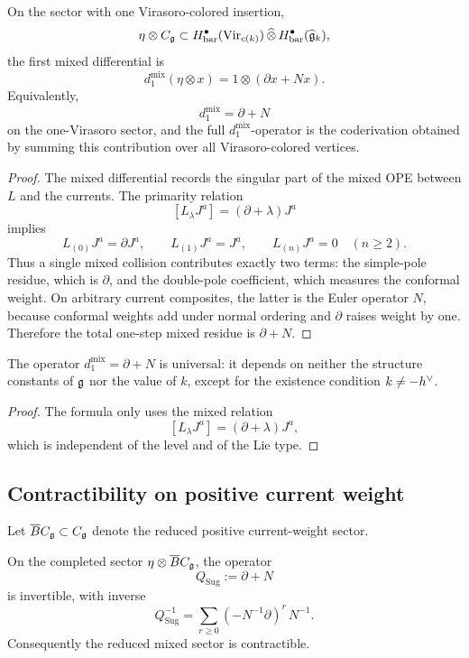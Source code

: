 \begin{theorem}\label{thm:universal-d1}
On the sector with one Virasoro-colored insertion,
\[
\eta\otimes C_{\mathfrak g}\subset
H^\bullet_{\mathrm{bar}}(\operatorname{Vir}_{c(k)})\,\widehat\otimes\, H^\bullet_{\mathrm{bar}}(\widehat{\mathfrak g}_k),
\]
the first mixed differential is
\[
d_1^{\mathrm{mix}}(\eta\otimes x)=1\otimes(\partial x+N x).
\]
Equivalently,
\[
d_1^{\mathrm{mix}}=\partial+N
\]
on the one-Virasoro sector, and the full \(d_1^{\mathrm{mix}}\)-operator is the coderivation obtained by summing this contribution over all Virasoro-colored vertices.
\end{theorem}

\begin{proof}
The mixed differential records the singular part of the mixed OPE between \(L\) and the currents. The primarity relation
\[
[L_\lambda J^a]=(\partial+\lambda)J^a
\]
implies
\[
L_{(0)}J^a=\partial J^a,\qquad
L_{(1)}J^a=J^a,\qquad
L_{(n)}J^a=0\quad(n\ge 2).
\]
Thus a single mixed collision contributes exactly two terms: the simple-pole residue, which is \(\partial\), and the double-pole coefficient, which measures the conformal weight. On arbitrary current composites, the latter is the Euler operator \(N\), because conformal weights add under normal ordering and \(\partial\) raises weight by one. Therefore the total one-step mixed residue is \(\partial+N\).
\end{proof}

\begin{corollary}[universality]
The operator \(d_1^{\mathrm{mix}}=\partial+N\) is universal: it depends on neither the structure constants of \(\mathfrak g\) nor the value of \(k\), except for the existence condition \(k\neq -h^\vee\).
\end{corollary}

\begin{proof}
The formula only uses the mixed relation
\[
[L_\lambda J^a]=(\partial+\lambda)J^a,
\]
which is independent of the level and of the Lie type.
\end{proof}

\subsection{Contractibility on positive current weight}

Let \(\overline{B} C_{\mathfrak g}\subset C_{\mathfrak g}\) denote the reduced positive current-weight sector.

\begin{proposition}\label{prop:contraction}
On the completed sector \(\eta\otimes \overline{B} C_{\mathfrak g}\), the operator
\[
Q_{\mathrm{Sug}}:=\partial+N
\]
is invertible, with inverse
\[
Q_{\mathrm{Sug}}^{-1}
=
\sum_{r\ge 0}(-N^{-1}\partial)^r\,N^{-1}.
\]
Consequently the reduced mixed sector is contractible.
\end{proposition}

